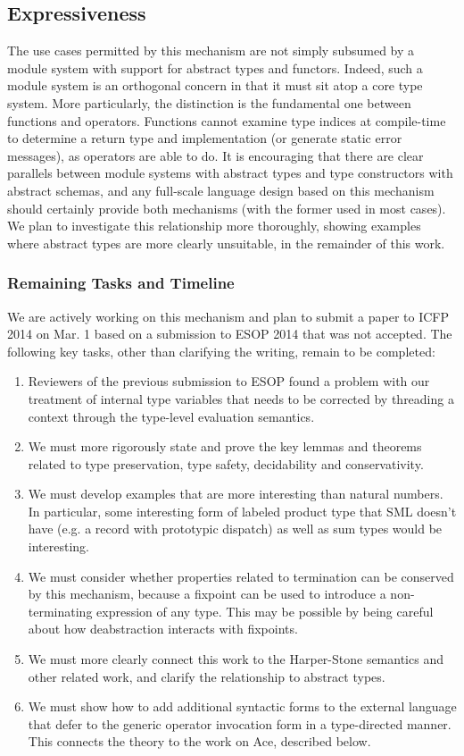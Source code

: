 \subsection{Expressiveness}
The use cases permitted by this mechanism are not simply subsumed by a module system with support for abstract types and functors. Indeed, such a module system is an orthogonal concern in that it must sit atop a core type system. More particularly, the distinction is the fundamental one between functions and operators. Functions cannot examine type indices at compile-time to determine a return type and implementation (or generate static error messages), as operators are able to do. It is encouraging that there are clear parallels between module systems with abstract types and type constructors with abstract schemas, and any full-scale language design based on this mechanism should certainly provide both mechanisms (with the former used in most cases). We plan to investigate this relationship more thoroughly, showing examples where abstract types are more clearly unsuitable, in the remainder of this work. 


\subsubsection{Remaining Tasks and Timeline}
We are actively working on this mechanism and plan to submit a paper to ICFP 2014 on Mar. 1 based on a submission to ESOP 2014 that was not accepted. The following key tasks, other than clarifying the writing, remain to be completed:

\begin{enumerate}
\item Reviewers of the previous submission to ESOP found a problem with our treatment of internal type variables that needs to be corrected by threading a context through the type-level evaluation semantics.
\item We must more rigorously state and prove the key lemmas and theorems related to type preservation, type safety, decidability and conservativity. 
\item We must develop examples that are more interesting than natural numbers. In particular, some interesting form of labeled product type that SML doesn't have (e.g. a record with prototypic dispatch) as well as sum types would be interesting.
\item We must consider whether properties related to termination can be conserved by this mechanism, because a fixpoint can be used to introduce a non-terminating expression of any type. This may be possible by being careful about how deabstraction interacts with fixpoints.
\item We must more clearly connect this work to the Harper-Stone semantics and other related work, and clarify  the relationship to abstract types.
\item We must show how to add additional syntactic forms to the external language that defer to the generic operator invocation form in a type-directed manner. This connects the theory to the work on Ace, described below. 
\end{enumerate}

